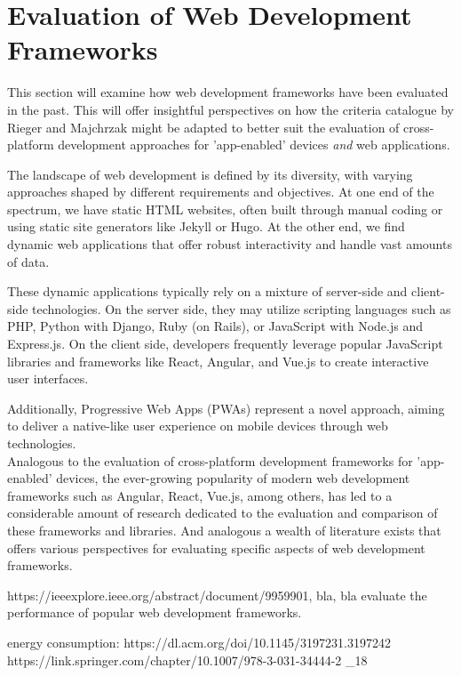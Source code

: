 \section{Evaluation of Web Development Frameworks}
This section will examine how web development frameworks have been evaluated in the past. This will offer insightful perspectives on how the criteria catalogue by Rieger and Majchrzak might be adapted to better suit the evaluation of cross-platform development approaches for 'app-enabled' devices \emph{and} web applications.


The landscape of web development is defined by its diversity, with varying approaches shaped by different requirements and objectives. At one end of the spectrum, we have static HTML websites, often built through manual coding or using static site generators like Jekyll or Hugo. At the other end, we find dynamic web applications that offer robust interactivity and handle vast amounts of data.

These dynamic applications typically rely on a mixture of server-side and client-side technologies. On the server side, they may utilize scripting languages such as PHP, Python with Django, Ruby (on Rails), or JavaScript with Node.js and Express.js. On the client side, developers frequently leverage popular JavaScript libraries and frameworks like React, Angular, and Vue.js to create interactive user interfaces.

Additionally, Progressive Web Apps (PWAs) represent a novel approach, aiming to deliver a native-like user experience on mobile devices through web technologies.
\\



Analogous to the evaluation of cross-platform development frameworks for 'app-enabled' devices, the ever-growing popularity of modern web development frameworks such as Angular, React, Vue.js, among others, has led to a considerable amount of research dedicated to the evaluation and comparison of these frameworks and libraries.
And analogous a wealth of literature exists that offers various perspectives for evaluating specific aspects of web development frameworks. 

https://ieeexplore.ieee.org/abstract/document/9959901, bla, bla 
evaluate the performance of popular web development frameworks. 

energy consumption:
https://dl.acm.org/doi/10.1145/3197231.3197242                                         
https://link.springer.com/chapter/10.1007/978-3-031-34444-2                                 _18



